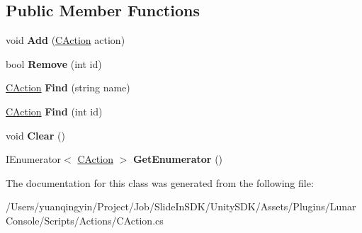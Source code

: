 \subsection*{Public Member Functions}
\begin{DoxyCompactItemize}
\item 
\mbox{\label{class_lunar_console_plugin_internal_1_1_c_action_list_a20ee71f89a09ca74e1e38fda0e13e109}} 
void {\bfseries Add} (\mbox{\hyperlink{class_lunar_console_plugin_internal_1_1_c_action}{C\+Action}} action)
\item 
\mbox{\label{class_lunar_console_plugin_internal_1_1_c_action_list_ae60eb2b76c26ed4b6f2dc5da63c91f1b}} 
bool {\bfseries Remove} (int id)
\item 
\mbox{\label{class_lunar_console_plugin_internal_1_1_c_action_list_a6344ed665254666bb483ba5b311023ab}} 
\mbox{\hyperlink{class_lunar_console_plugin_internal_1_1_c_action}{C\+Action}} {\bfseries Find} (string name)
\item 
\mbox{\label{class_lunar_console_plugin_internal_1_1_c_action_list_a5f2c52010b930f2f9e7724f15a0a9cbf}} 
\mbox{\hyperlink{class_lunar_console_plugin_internal_1_1_c_action}{C\+Action}} {\bfseries Find} (int id)
\item 
\mbox{\label{class_lunar_console_plugin_internal_1_1_c_action_list_a5b67a4265ae8fa194ec1df5c213c7717}} 
void {\bfseries Clear} ()
\item 
\mbox{\label{class_lunar_console_plugin_internal_1_1_c_action_list_a5a2e4854e22a5f3c9da26705e1e38433}} 
I\+Enumerator$<$ \mbox{\hyperlink{class_lunar_console_plugin_internal_1_1_c_action}{C\+Action}} $>$ {\bfseries Get\+Enumerator} ()
\end{DoxyCompactItemize}


The documentation for this class was generated from the following file\+:\begin{DoxyCompactItemize}
\item 
/\+Users/yuanqingyin/\+Project/\+Job/\+Slide\+In\+S\+D\+K/\+Unity\+S\+D\+K/\+Assets/\+Plugins/\+Lunar\+Console/\+Scripts/\+Actions/C\+Action.\+cs\end{DoxyCompactItemize}
